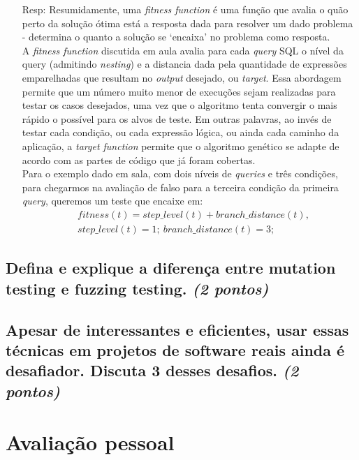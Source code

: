 \documentclass[paper=a4, fontsize=11pt]{scrartcl} %
\numberwithin{equation}{section} %
\numberwithin{figure}{section} %
\numberwithin{table}{section} %
\begin{document}
    \begin{itemize}
        \item[Resp:] Resumidamente, uma \textit{fitness function} é uma função que avalia o quão perto da solução ótima está a resposta dada para resolver um dado problema - determina o quanto a solução se `encaixa' no problema como resposta.\\
        A \textit{fitness function} discutida em aula avalia para cada \textit{query} SQL o nível da query (admitindo \textit{nesting}) e a distancia dada pela quantidade de expressões emparelhadas que resultam no \textit{output} desejado, ou \textit{target}. Essa abordagem permite que um número muito menor de execuções sejam realizadas para testar os casos desejados, uma vez que o algoritmo tenta convergir o mais rápido o possível para os alvos de teste. Em outras palavras, ao invés de testar cada condição, ou cada expressão lógica, ou ainda cada caminho da aplicação, a \textit{target function} permite que o algoritmo genético se adapte de acordo com as partes de código que já foram cobertas.\\
        Para o exemplo dado em sala, com dois níveis de \textit{queries} e três condições, para chegarmos na avaliação de falso para a terceira condição da primeira \textit{query}, queremos um teste que encaixe em:
        \begin{align*}
           & fitness(t)=step\_level(t)+branch\_distance(t),\\
           & step\_level(t)=1;\ branch\_distance(t)=3;
        \end{align*}         
    \end{itemize}

\subsection{Defina e explique a diferença entre mutation testing e fuzzing testing. \textit{(2 pontos)}}

\lipsum[6] %

\subsection{Apesar de interessantes e eficientes, usar essas técnicas em projetos de software reais ainda é desafiador. Discuta 3 desses desafios. \textit{(2 pontos)}}

\section{Avaliação pessoal}
\end{document}
